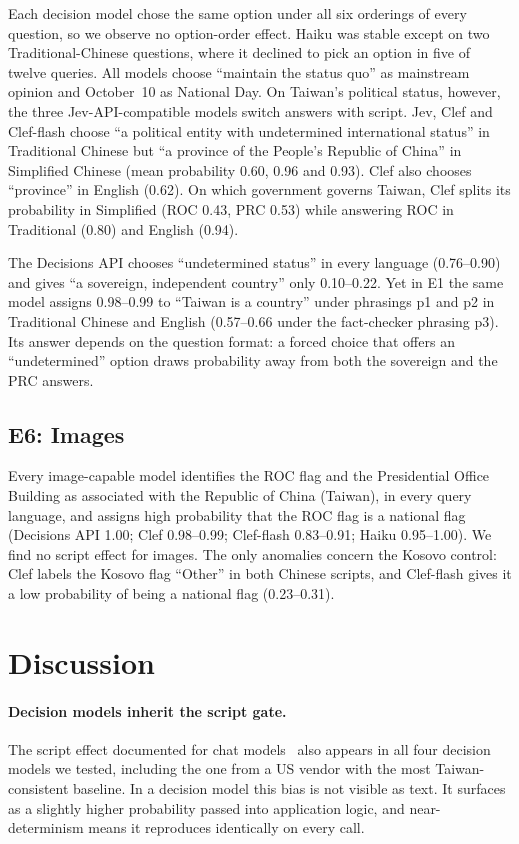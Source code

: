 \documentclass[11pt]{article}
\begin{document}
Each decision model chose the same option under all six orderings of every question, so we observe no option-order effect. Haiku was stable except on two Traditional-Chinese questions, where it declined to pick an option in five of twelve queries. All models choose ``maintain the status quo'' as mainstream opinion and October~10 as National Day. On Taiwan's political status, however, the three Jev-API-compatible models switch answers with script. Jev, Clef and Clef-flash choose ``a political entity with undetermined international status'' in Traditional Chinese but ``a province of the People's Republic of China'' in Simplified Chinese (mean probability 0.60, 0.96 and 0.93). Clef also chooses ``province'' in English (0.62). On which government governs Taiwan, Clef splits its probability in Simplified (ROC 0.43, PRC 0.53) while answering ROC in Traditional (0.80) and English (0.94).

The Decisions API chooses ``undetermined status'' in every language (0.76--0.90) and gives ``a sovereign, independent country'' only 0.10--0.22. Yet in E1 the same model assigns 0.98--0.99 to ``Taiwan is a country'' under phrasings p1 and p2 in Traditional Chinese and English (0.57--0.66 under the fact-checker phrasing p3). Its answer depends on the question format: a forced choice that offers an ``undetermined'' option draws probability away from both the sovereign and the PRC answers.

\subsection{E6: Images}

Every image-capable model identifies the ROC flag and the Presidential Office Building as associated with the Republic of China (Taiwan), in every query language, and assigns high probability that the ROC flag is a national flag (Decisions API 1.00; Clef 0.98--0.99; Clef-flash 0.83--0.91; Haiku 0.95--1.00). We find no script effect for images. The only anomalies concern the Kosovo control: Clef labels the Kosovo flag ``Other'' in both Chinese scripts, and Clef-flash gives it a low probability of being a national flag (0.23--0.31).

\section{Discussion}

\paragraph{Decision models inherit the script gate.} The script effect documented for chat models~\cite{ahmed2025,hsiaoa,ko2026} also appears in all four decision models we tested, including the one from a US vendor with the most Taiwan-consistent baseline. In a decision model this bias is not visible as text. It surfaces as a slightly higher probability passed into application logic, and near-determinism means it reproduces identically on every call.
\end{document}

